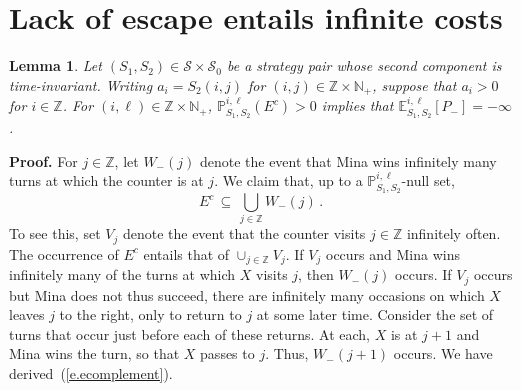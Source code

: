\documentclass[letterpaper,11pt,oneside,reqno]{amsbook}
\newcommand{\PP}{\ensuremath{\mathbb{P}}}
\newcommand{\N}{\ensuremath{\mathbb{N}}}
\newcommand{\Z}{\ensuremath{\mathbb{Z}}}
\newcommand{\E}[0]{\mathbb{E}}
\numberwithin{figure}{chapter}
\newtheorem{lemma}[theorem]{Lemma}
\theoremstyle{definition}
\theoremstyle{definition}
\theoremstyle{definition}
\theoremstyle{definition}
\theoremstyle{definition}
\newcommand{\mc}{\mathcal}
\newcommand{\nwithoutzero}{\N_+}
\newcommand\pgameplay[3]{\PP^{#3}_{#1,#2}}
\newcommand{\cross}{W}
\begin{document}
  \section{Lack of escape entails infinite costs}  
  \begin{lemma}\label{l.dontlookback}
  Let $(S_1,S_2) \in \mc{S} \times \mc{S}_0$ be a strategy pair whose second component is time-invariant.
  Writing $a_i = S_2(i,j)$ for $(i,j) \in \Z \times \nwithoutzero$, suppose that $a_i > 0$ for $i \in \Z$.
For $(i,\ell) \in \Z \times \nwithoutzero$, 
  $\PP_{S_1,S_2}^{i,\ell}(E^c) > 0$ implies that $\E_{S_1,S_2}^{i,\ell} [P_-] = -\infty$.
  \end{lemma}
 {\bf Proof.}
 For $j \in \Z$, let $\cross_-(j)$ denote the event that Mina wins infinitely many turns at which the counter is at $j$. We claim that, up to a $\pgameplay{S_1}{S_2}{i,\ell}$-null set,
 \begin{equation}\label{e.ecomplement}
 E^c \, \subseteq \, \bigcup_{j \in \Z} \cross_-(j) \, .
 \end{equation}
 To see this, set $V_j$ denote the event that the counter visits $j \in \Z$ infinitely often. The occurrence of $E^c$ entails that of $\cup_{j \in \Z} V_j$. If $V_j$ occurs and Mina wins infinitely many of the turns at which $X$ visits $j$,
 then $\cross_-(j)$ occurs. If $V_j$ occurs but Mina does not thus succeed, there are infinitely many occasions on which $X$ leaves $j$ to the right, only to return to $j$ at some later time. Consider the set of turns that occur just before each of these returns. At each, $X$ is at $j+1$ and Mina wins the turn, so that $X$ passes to $j$. Thus, $\cross_-(j+1)$ occurs. We have derived~(\ref{e.ecomplement}).
 
\end{document}
